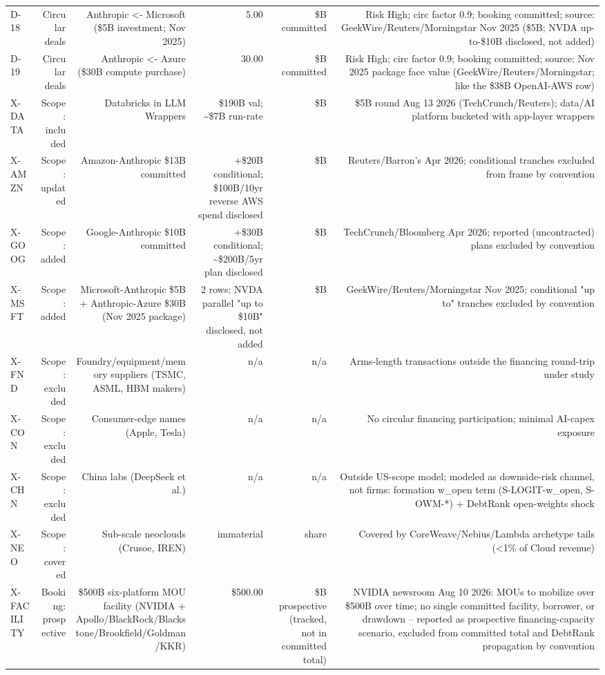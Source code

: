 \begin{tabular}{@{}lrrrrr@{}}
D-18 & Circular deals & Anthropic <- Microsoft (\$5B investment; Nov 2025) & 5.00 & \$B committed & Risk High; circ factor 0.9; booking committed; source: GeekWire/Reuters/Morningstar Nov 2025 (\$5B; NVDA up-to-\$10B disclosed, not added) \\
D-19 & Circular deals & Anthropic <- Azure (\$30B compute purchase) & 30.00 & \$B committed & Risk High; circ factor 0.9; booking committed; source: Nov 2025 package face value (GeekWire/Reuters/Morningstar; like the \$38B OpenAI-AWS row) \\
X-DATA & Scope: included & Databricks in LLM Wrappers & \$190B val; \textasciitilde{}\$7B run-rate & \$B & \$5B round Aug 13 2026 (TechCrunch/Reuters); data/AI platform bucketed with app-layer wrappers \\
X-AMZN & Scope: updated & Amazon-Anthropic \$13B committed & +\$20B conditional; \$100B/10yr reverse AWS spend disclosed & \$B & Reuters/Barron's Apr 2026; conditional tranches excluded from frame by convention \\
X-GOOG & Scope: added & Google-Anthropic \$10B committed & +\$30B conditional; \textasciitilde{}\$200B/5yr plan disclosed & \$B & TechCrunch/Bloomberg Apr 2026; reported (uncontracted) plans excluded by convention \\
X-MSFT & Scope: added & Microsoft-Anthropic \$5B + Anthropic-Azure \$30B (Nov 2025 package) & 2 rows; NVDA parallel "up to \$10B" disclosed, not added & \$B & GeekWire/Reuters/Morningstar Nov 2025; conditional "up to" tranches excluded by convention \\
X-FND & Scope: excluded & Foundry/equipment/memory suppliers (TSMC, ASML, HBM makers) & n/a & n/a & Arms-length transactions outside the financing round-trip under study \\
X-CON & Scope: excluded & Consumer-edge names (Apple, Tesla) & n/a & n/a & No circular financing participation; minimal AI-capex exposure \\
X-CHN & Scope: excluded & China labs (DeepSeek et al.) & n/a & n/a & Outside US-scope model; modeled as downside-risk channel, not firms: formation w\_open term (S-LOGIT-w\_open, S-OWM-*) + DebtRank open-weights shock \\
X-NEO & Scope: covered & Sub-scale neoclouds (Crusoe, IREN) & immaterial & share & Covered by CoreWeave/Nebius/Lambda archetype tails (<1\% of Cloud revenue) \\
X-FACILITY & Booking: prospective & \$500B six-platform MOU facility (NVIDIA + Apollo/BlackRock/Blackstone/Brookfield/Goldman/KKR) & \$500.00 & \$B prospective (tracked, not in committed total) & NVIDIA newsroom Aug 10 2026: MOUs to mobilize over \$500B over time; no single committed facility, borrower, or drawdown -- reported as prospective financing-capacity scenario, excluded from committed total and DebtRank propagation by convention \\

\end{tabular}
